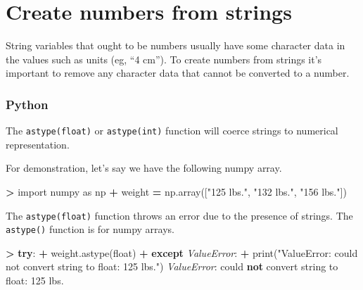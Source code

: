 \documentclass[
]{book}
\newenvironment{Shaded}{\begin{snugshade}}{\end{snugshade}}
\newcommand{\BuiltInTok}[1]{#1}
\newcommand{\ControlFlowTok}[1]{\textcolor[rgb]{0.13,0.29,0.53}{\textbf{#1}}}
\newcommand{\ImportTok}[1]{#1}
\newcommand{\KeywordTok}[1]{\textcolor[rgb]{0.13,0.29,0.53}{\textbf{#1}}}
\newcommand{\NormalTok}[1]{#1}
\newcommand{\OperatorTok}[1]{\textcolor[rgb]{0.81,0.36,0.00}{\textbf{#1}}}
\newcommand{\PreprocessorTok}[1]{\textcolor[rgb]{0.56,0.35,0.01}{\textit{#1}}}
\newcommand{\StringTok}[1]{\textcolor[rgb]{0.31,0.60,0.02}{#1}}
\begin{document}
\hypertarget{create-numbers-from-strings}{%
\section{Create numbers from strings}\label{create-numbers-from-strings}}

String variables that ought to be numbers usually have some character data in the values such as units (eg, ``4 cm''). To create numbers from strings it's important to remove any character data that cannot be converted to a number.

\hypertarget{python-19}{%
\subsubsection*{Python}\label{python-19}}

The \texttt{astype(float)} or \texttt{astype(int)} function will coerce strings to numerical representation.

For demonstration, let's say we have the following numpy array.

\begin{Shaded}
\begin{Highlighting}[]
\OperatorTok{\textgreater{}} \ImportTok{import}\NormalTok{ numpy }\ImportTok{as}\NormalTok{ np}
\OperatorTok{+}\NormalTok{ weight }\OperatorTok{=}\NormalTok{ np.array([}\StringTok{"125 lbs."}\NormalTok{, }\StringTok{"132 lbs."}\NormalTok{, }\StringTok{"156 lbs."}\NormalTok{])}
\end{Highlighting}
\end{Shaded}

The \texttt{astype(float)} function throws an error due to the presence of strings. The \texttt{astype()} function is for numpy arrays.

\begin{Shaded}
\begin{Highlighting}[]
\OperatorTok{\textgreater{}} \ControlFlowTok{try}\NormalTok{:}
\OperatorTok{+}\NormalTok{   weight.astype(}\BuiltInTok{float}\NormalTok{)}
\OperatorTok{+} \ControlFlowTok{except} \PreprocessorTok{ValueError}\NormalTok{:}
\OperatorTok{+}   \BuiltInTok{print}\NormalTok{(}\StringTok{"ValueError: could not convert string to float: \textquotesingle{}125 lbs.\textquotesingle{}"}\NormalTok{)}
\PreprocessorTok{ValueError}\NormalTok{: could }\KeywordTok{not}\NormalTok{ convert string to }\BuiltInTok{float}\NormalTok{: }\StringTok{\textquotesingle{}125 lbs.\textquotesingle{}}
\end{Highlighting}
\end{Shaded}
\end{document}
